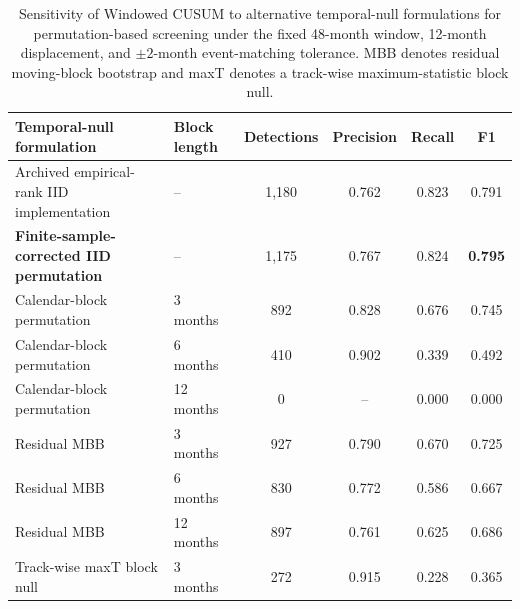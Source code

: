 \begin{table}[pos=!htbp]
    \centering
    \small
    \caption{Sensitivity of Windowed CUSUM to alternative temporal-null formulations for permutation-based screening under the fixed 48-month window, 12-month displacement, and $\pm2$-month event-matching tolerance. MBB denotes residual moving-block bootstrap and maxT denotes a track-wise maximum-statistic block null.}
    \label{tab:temporal_null_sensitivity}

    \begin{tabular}{llcccc}
        \toprule
        Temporal-null formulation
        & Block length
        & Detections
        & Precision
        & Recall
        & F1 \\
        \midrule

        Archived empirical-rank IID implementation
        & --
        & 1,180
        & 0.762
        & 0.823
        & 0.791 \\

        \textbf{Finite-sample-corrected IID permutation}
        & --
        & 1,175
        & 0.767
        & 0.824
        & \textbf{0.795} \\

        Calendar-block permutation
        & 3 months
        & 892
        & 0.828
        & 0.676
        & 0.745 \\

        Calendar-block permutation
        & 6 months
        & 410
        & 0.902
        & 0.339
        & 0.492 \\

        Calendar-block permutation
        & 12 months
        & 0
        & --
        & 0.000
        & 0.000 \\

        Residual MBB
        & 3 months
        & 927
        & 0.790
        & 0.670
        & 0.725 \\

        Residual MBB
        & 6 months
        & 830
        & 0.772
        & 0.586
        & 0.667 \\

        Residual MBB
        & 12 months
        & 897
        & 0.761
        & 0.625
        & 0.686 \\

        Track-wise maxT block null
        & 3 months
        & 272
        & 0.915
        & 0.228
        & 0.365 \\

        \bottomrule
    \end{tabular}
\end{table}

